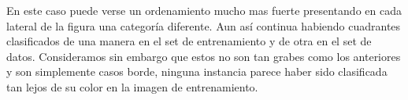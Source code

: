 En este caso puede verse un ordenamiento mucho mas fuerte presentando en cada lateral de la figura una categoría diferente. Aun así continua habiendo cuadrantes clasificados de una manera en el set de entrenamiento y de otra en el set de datos. Consideramos sin embargo que estos no son tan grabes como los anteriores y son simplemente casos borde, ninguna instancia parece haber sido clasificada tan lejos de su color en la imagen de entrenamiento.
